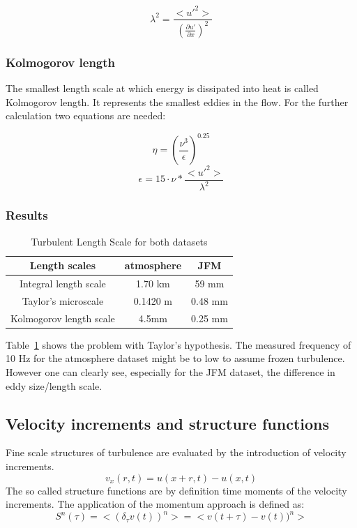 \documentclass[12pt]{article}
\begin{document}
\begin{equation}
\lambda^2 = \frac{<u'^2>}{(\frac{\partial u'}{\partial x})^2}
\end{equation}


\subsubsection{Kolmogorov length}
The smallest length scale at which energy is dissipated into heat is called Kolmogorov length. It represents the smallest eddies in the flow. For the further calculation two equations are needed:

\begin{equation}
\eta = (\frac{\nu^3}{\epsilon})^{0.25}
\end{equation}
\begin{equation}
\epsilon = 15 \cdot \nu * \frac{<u'^2>}{\lambda^2}
\end{equation}

\subsubsection{Results}
\begin{table}[H]
\begin{center}
\begin{tabular}{c c c}
\hline
Length scales & atmosphere & JFM\\
\hline
Integral length scale & 1.70 km &59 mm\\
Taylor's microscale & 0.1420 m & 0.48 mm\\
Kolmogorov length scale & 4.5mm & 0.25 mm\\
\hline
\end{tabular}
\caption{Turbulent Length Scale for both datasets}
\label{table:length_scales}
\end{center}
\end{table}
Table~\ref{table:length_scales} shows the problem with Taylor's hypothesis. The measured frequency of 10 Hz for the atmosphere dataset might be to low to assume frozen turbulence. However one can clearly see, especially for the JFM dataset, the difference in eddy size/length scale.
\subsection{Velocity increments and structure functions}
Fine scale structures of turbulence are evaluated by the introduction of velocity increments. 
\begin{equation}
v_x(r,t) = u(x+r,t)-u(x,t)
\end{equation}
The so called structure functions are by definition time moments of the velocity increments. \cite{peinke} The application of the momentum approach is defined as:
\begin{equation}
S^n(\tau) = <(\delta_{\tau}v(t))^n> = <v(t+\tau)-v(t))^n>
\end{equation}
\end{document}

